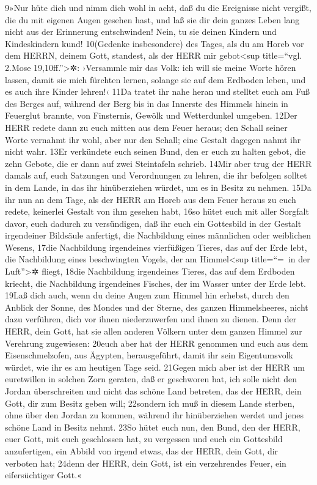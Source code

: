 9»Nur hüte dich und nimm dich wohl in acht, daß du die Ereignisse nicht
vergißt, die du mit eigenen Augen gesehen hast, und laß sie dir dein
ganzes Leben lang nicht aus der Erinnerung entschwinden! Nein, tu sie
deinen Kindern und Kindeskindern kund! 10(Gedenke insbesondere) des
Tages, als du am Horeb vor dem HERRN, deinem Gott, standest, als der
HERR mir gebot\textless sup title=``vgl. 2.Mose 19,10ff.''\textgreater✲:
›Versammle mir das Volk: ich will sie meine Worte hören lassen, damit
sie mich fürchten lernen, solange sie auf dem Erdboden leben, und es
auch ihre Kinder lehren!‹ 11Da tratet ihr nahe heran und stelltet euch
am Fuß des Berges auf, während der Berg bis in das Innerste des Himmels
hinein in Feuerglut brannte, von Finsternis, Gewölk und Wetterdunkel
umgeben. 12Der HERR redete dann zu euch mitten aus dem Feuer heraus; den
Schall seiner Worte vernahmt ihr wohl, aber nur den Schall; eine Gestalt
dagegen nahmt ihr nicht wahr. 13Er verkündete euch seinen Bund, den er
euch zu halten gebot, die zehn Gebote, die er dann auf zwei Steintafeln
schrieb. 14Mir aber trug der HERR damals auf, euch Satzungen und
Verordnungen zu lehren, die ihr befolgen solltet in dem Lande, in das
ihr hinüberziehen würdet, um es in Besitz zu nehmen. 15Da ihr nun an dem
Tage, als der HERR am Horeb aus dem Feuer heraus zu euch redete,
keinerlei Gestalt von ihm gesehen habt, 16so hütet euch mit aller
Sorgfalt davor, euch dadurch zu versündigen, daß ihr euch ein Gottesbild
in der Gestalt irgendeiner Bildsäule anfertigt, die Nachbildung eines
männlichen oder weiblichen Wesens, 17die Nachbildung irgendeines
vierfüßigen Tieres, das auf der Erde lebt, die Nachbildung eines
beschwingten Vogels, der am Himmel\textless sup title=``=~in der
Luft''\textgreater✲ fliegt, 18die Nachbildung irgendeines Tieres, das
auf dem Erdboden kriecht, die Nachbildung irgendeines Fisches, der im
Wasser unter der Erde lebt. 19Laß dich auch, wenn du deine Augen zum
Himmel hin erhebst, durch den Anblick der Sonne, des Mondes und der
Sterne, des ganzen Himmelsheeres, nicht dazu verführen, dich vor ihnen
niederzuwerfen und ihnen zu dienen. Denn der HERR, dein Gott, hat sie
allen anderen Völkern unter dem ganzen Himmel zur Verehrung zugewiesen:
20euch aber hat der HERR genommen und euch aus dem Eisenschmelzofen, aus
Ägypten, herausgeführt, damit ihr sein Eigentumsvolk würdet, wie ihr es
am heutigen Tage seid. 21Gegen mich aber ist der HERR um euretwillen in
solchen Zorn geraten, daß er geschworen hat, ich solle nicht den Jordan
überschreiten und nicht das schöne Land betreten, das der HERR, dein
Gott, dir zum Besitz geben will; 22sondern ich muß in diesem Lande
sterben, ohne über den Jordan zu kommen, während ihr hinüberziehen
werdet und jenes schöne Land in Besitz nehmt. 23So hütet euch nun, den
Bund, den der HERR, euer Gott, mit euch geschlossen hat, zu vergessen
und euch ein Gottesbild anzufertigen, ein Abbild von irgend etwas, das
der HERR, dein Gott, dir verboten hat; 24denn der HERR, dein Gott, ist
ein verzehrendes Feuer, ein eifersüchtiger Gott.«

